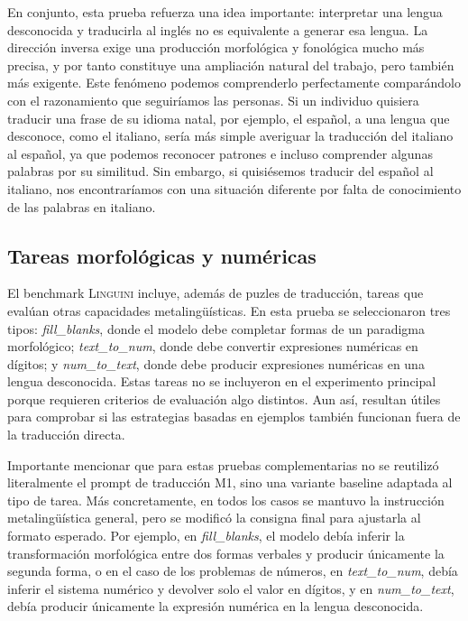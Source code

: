 En conjunto, esta prueba refuerza una idea importante: interpretar una lengua desconocida y traducirla al inglés no es equivalente a generar esa lengua. La dirección inversa exige una producción morfológica y fonológica mucho más precisa, y por tanto constituye una ampliación natural del trabajo, pero también más exigente. Este fenómeno podemos comprenderlo perfectamente comparándolo con el razonamiento que seguiríamos las personas. Si un individuo quisiera traducir una frase de su idioma natal, por ejemplo, el español, a una lengua que desconoce, como el italiano, sería más simple averiguar la traducción del italiano al español, ya que podemos reconocer patrones e incluso comprender algunas palabras por su similitud. Sin embargo, si quisiésemos traducir del español al italiano, nos encontraríamos con una situación diferente por falta de conocimiento de las palabras en italiano.

\subsection{Tareas morfológicas y numéricas}
\label{subsec:otras-tareas}

El benchmark \textsc{Linguini} incluye, además de puzles de traducción, tareas que evalúan otras capacidades metalingüísticas. En esta prueba se seleccionaron tres tipos: \textit{fill\_blanks}, donde el modelo debe completar formas de un paradigma morfológico; \textit{text\_to\_num}, donde debe convertir expresiones numéricas en dígitos; y \textit{num\_to\_text}, donde debe producir expresiones numéricas en una lengua desconocida. Estas tareas no se incluyeron en el experimento principal porque requieren criterios de evaluación algo distintos. Aun así, resultan útiles para comprobar si las estrategias basadas en ejemplos también funcionan fuera de la traducción directa.

Importante mencionar que para estas pruebas complementarias no se reutilizó literalmente el prompt de traducción M1, sino una variante baseline adaptada al tipo de tarea. Más concretamente, en todos los casos se mantuvo la instrucción metalingüística general, pero se modificó la consigna final para ajustarla al formato esperado. Por ejemplo, en \textit{fill\_blanks}, el modelo debía inferir la transformación morfológica entre dos formas verbales y producir únicamente la segunda forma, o en el caso de los problemas de números, en \textit{text\_to\_num}, debía inferir el sistema numérico y devolver solo el valor en dígitos, y en \textit{num\_to\_text}, debía producir únicamente la expresión numérica en la lengua desconocida.

